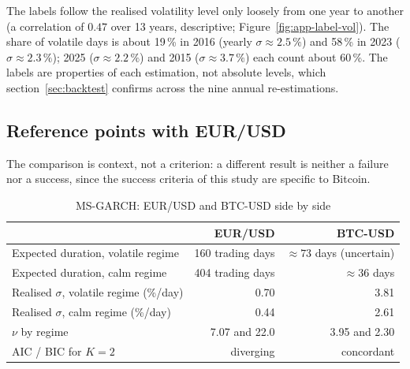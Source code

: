\documentclass[12pt,a4paper]{article}
\begin{document}
The labels follow the realised volatility level only loosely from one year to another (a correlation of $0.47$ over 13 years, descriptive; Figure~\ref{fig:app-label-vol}). The share of volatile days is about 19\,\% in 2016 (yearly $\sigma\approx 2.5\,\%$) and 58\,\% in 2023 ($\sigma\approx 2.3\,\%$); 2025 ($\sigma\approx 2.2\,\%$) and 2015 ($\sigma \approx 3.7\,\%$) each count about 60\,\%. The labels are properties of each estimation, not absolute levels, which section~\ref{sec:backtest} confirms across the nine annual re-estimations.

\subsection{Reference points with EUR/USD}

The comparison is context, not a criterion: a different result is neither a failure nor a success, since the success criteria of this study are specific to Bitcoin.

\begin{table}[H]
	\centering
	\caption{MS-GARCH: EUR/USD and BTC-USD side by side}
	\label{tab:ms-eur}
	\begin{tabular}{lrr}
		\toprule
		& EUR/USD & BTC-USD \\
		\midrule
		Expected duration, volatile regime & 160 trading days & $\approx 73$ days (uncertain) \\
		Expected duration, calm regime & 404 trading days & $\approx 36$ days \\
		Realised $\sigma$, volatile regime (\%/day) & 0.70 & 3.81 \\
		Realised $\sigma$, calm regime (\%/day) & 0.44 & 2.61 \\
		$\nu$ by regime & 7.07 and 22.0 & 3.95 and 2.30 \\
		AIC / BIC for $K=2$ & diverging & concordant \\
		\bottomrule
	\end{tabular}
\end{table}
\end{document}
